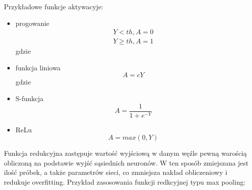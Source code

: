 Przykładowe funkcje aktywacyje:
\begin{itemize}
\item progowanie
\begin{equation*}
\begin{aligned}
Y < th, A = 0\\
Y \geq th, A = 1
\end{aligned}
\end{equation*}
gdzie
\item funkcja liniowa
\begin{equation*}
A = cY
\end{equation*}
gdzie
\item S-funkcja
\begin{equation*}
A = \frac{1}{1+e^{-Y}}
\end{equation*}
\item ReLu
\begin{equation*}
A = max(0,Y)
\end{equation*}
\end{itemize}

Funkcja redukcyjna zastępuje wartość wyjściową w danym węźle pewną warością obliczoną na podstawie wyjść sąsiednich neuronów. W ten sposób zmiejszana jest ilość próbek, a także parametrów sieci, co zmniejsza nakład obliczeniowy i redukuje overfitting. Przykład zasosowania funkcji redkcyjnej typu max pooling:

